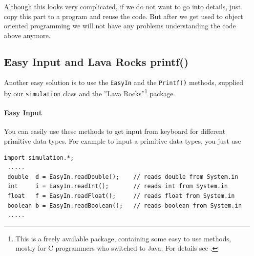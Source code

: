 Although this looks very complicated, if we do not want to go into
details, just copy this part to a program and reuse the code.
But after we get used to object oriented programming we will not have
any problems understanding the code above anymore.

\subsection{Easy Input and Lava Rocks printf()}
\label{sec:LavaRocks}
Another easy solution is to use the \verb|EasyIn| and the
\verb|Printf()| methods, supplied by our \verb|simulation| class
and the ''Lava Rocks''\footnote{This is a freely available package,
containing some easy to use methods, mostly for C programmers
who switched to Java. For details see \cite{LavaRocks}.} package.

\paragraph{Easy Input}
You can easily use these methods to get input from keyboard
for different primitive data types. For example to input
a primitive data types, you just use
\begin{small}
\begin{verbatim}
import simulation.*;
 .....
 double  d = EasyIn.readDouble();    // reads double from System.in
 int     i = EasyIn.readInt();       // reads int from System.in
 float   f = EasyIn.readFloat();     // reads float from System.in
 boolean b = EasyIn.readBoolean();   // reads boolean from System.in
 .....
\end{verbatim}
\end{small}

